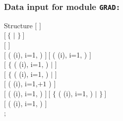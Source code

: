 \subsubsection{Data input for module \texttt{GRAD:}}\label{sect:grad_data}

\begin{DataStructure}{Structure }
$[$   $]$ \\
$[~\{$  $|$  $\}~]$ \\
$[$   $]$ \\
$[$  ( (i), i=1, ) $]~[$  ( (i), i=1, ) $]$ \\
$[$  $\{$ ( (i), i=1, ) $|$   $]$ \\
$[$  $\{$ ( (i), i=1, ) $|$   $]$ \\
$[$  ( (i), i=1,$+1$ ) $]$ \\
$[$  ( (i), i=1, ) $]~[$  $\{$ ( (i), i=1, ) $|$  $\}~]$ \\
$[$  ( (i), i=1, ) $]$ \\
;
\end{DataStructure}

